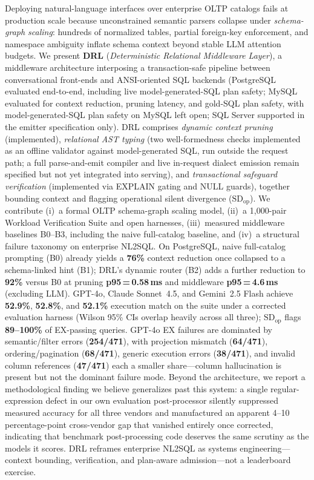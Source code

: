 \documentclass[twocolumn]{svjour3}
\begin{document}
Deploying natural-language interfaces over enterprise OLTP catalogs fails at production scale because unconstrained semantic parsers collapse under \emph{schema-graph scaling}: hundreds of normalized tables, partial foreign-key enforcement, and namespace ambiguity inflate schema context beyond stable LLM attention budgets.
We present \textbf{DRL} (\emph{Deterministic Relational Middleware Layer}), a middleware architecture interposing a transaction-safe pipeline between conversational front-ends and ANSI-oriented SQL backends (PostgreSQL evaluated end-to-end, including live model-generated-SQL plan safety; MySQL evaluated for context reduction, pruning latency, and gold-SQL plan safety, with model-generated-SQL plan safety on MySQL left open; SQL Server supported in the emitter specification only).
DRL comprises \emph{dynamic context pruning} (implemented), \emph{relational AST typing} (two well-formedness checks implemented as an offline validator against model-generated SQL, run outside the request path; a full parse-and-emit compiler and live in-request dialect emission remain specified but not yet integrated into serving), and \emph{transactional safeguard verification} (implemented via EXPLAIN gating and NULL guards), together bounding context and flagging operational silent divergence ($\text{SD}_{\text{op}}$).
We contribute (i)~a formal OLTP schema-graph scaling model, (ii)~a 1{,}000-pair Workload Verification Suite and open harnesses, (iii)~measured middleware baselines B0--B3, including the naive full-catalog baseline, and (iv)~a structural failure taxonomy on enterprise NL2SQL.
On PostgreSQL, naive full-catalog prompting (B0) already yields a \textbf{76\%} context reduction once collapsed to a schema-linked hint (B1); DRL's dynamic router (B2) adds a further reduction to \textbf{92\%} versus B0 at pruning \textbf{p95\,=\,0.58\,ms} and middleware \textbf{p95\,=\,4.6\,ms} (excluding LLM).
GPT-4o, Claude Sonnet~4.5, and Gemini~2.5 Flash achieve \textbf{52.9\%}, \textbf{52.8\%}, and \textbf{52.1\%} execution match on the suite under a corrected evaluation harness (Wilson 95\% CIs overlap heavily across all three); $\text{SD}_{\text{op}}$ flags \textbf{89--100\%} of EX-passing queries.
GPT-4o EX failures are dominated by semantic/filter errors (\textbf{254/471}), with projection mismatch (\textbf{64/471}), ordering/pagination (\textbf{68/471}), generic execution errors (\textbf{38/471}), and invalid column references (\textbf{47/471}) each a smaller share---column hallucination is present but not the dominant failure mode.
Beyond the architecture, we report a methodological finding we believe generalizes past this system: a single regular-expression defect in our own evaluation post-processor silently suppressed measured accuracy for all three vendors and manufactured an apparent 4--10 percentage-point cross-vendor gap that vanished entirely once corrected, indicating that benchmark post-processing code deserves the same scrutiny as the models it scores.
DRL reframes enterprise NL2SQL as systems engineering---context bounding, verification, and plan-aware admission---not a leaderboard exercise.
\end{document}
